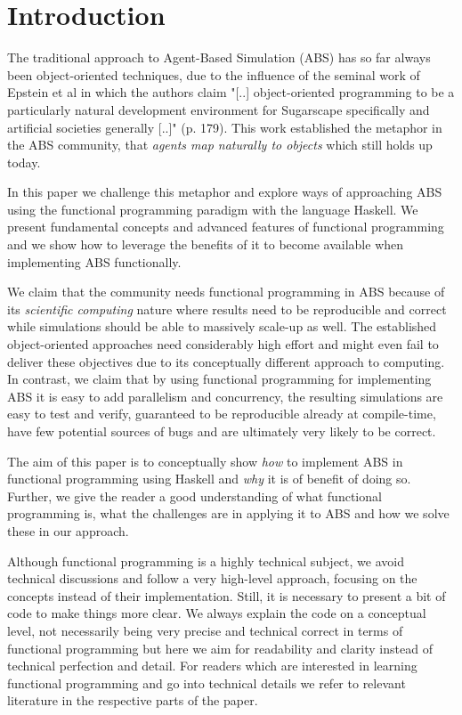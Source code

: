 \section{Introduction}
The traditional approach to Agent-Based Simulation (ABS) has so far always been object-oriented techniques, due to the influence of the seminal work of Epstein et al \cite{epstein_growing_1996} in which the authors claim "[..] object-oriented programming to be a particularly natural development environment for Sugarscape specifically and artificial societies generally [..]" (p. 179). This work established the metaphor in the ABS community, that \textit{agents map naturally to objects} \cite{north_managing_2007} which still holds up today.

In this paper we challenge this metaphor and explore ways of approaching ABS using the functional programming paradigm with the language Haskell. We present fundamental concepts and advanced features of functional programming and we show how to leverage the benefits of it \cite{hudak_haskell_1994, hudak_history_2007} to become available when implementing ABS functionally. 

We claim that the community needs functional programming in ABS because of its \textit{scientific computing} nature where results need to be reproducible and correct while simulations should be able to massively scale-up as well. The established object-oriented approaches need considerably high effort and might even fail to deliver these objectives due to its conceptually different approach to computing. In contrast, we claim that by using functional programming for implementing ABS it is easy to add parallelism and concurrency, the resulting simulations are easy to test and verify, guaranteed to be reproducible already at compile-time, have few potential sources of bugs and are ultimately very likely to be correct.

The aim of this paper is to conceptually show \textit{how} to implement ABS in functional programming using Haskell and \textit{why} it is of benefit of doing so. Further, we give the reader a good understanding of what functional programming is, what the challenges are in applying it to ABS and how we solve these in our approach. 

Although functional programming is a highly technical subject, we avoid technical discussions and follow a very high-level approach, focusing on the concepts instead of their implementation. Still, it is necessary to present a bit of code to make things more clear. We always explain the code on a conceptual level, not necessarily being very precise and technical correct in terms of functional programming but here we aim for readability and clarity instead of technical perfection and detail. For readers which are interested in learning functional programming and go into technical details we refer to relevant literature in the respective parts of the paper.

